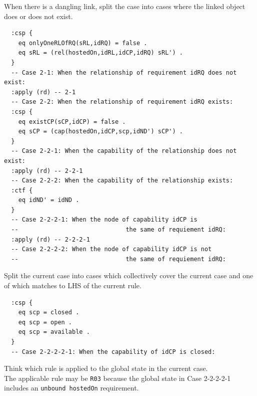 \documentclass[12pt]{report}
\begin{document}
 When there is a dangling link, split the case
into cases where the linked object does or does not exist.
\small
\begin{verbatim}
  :csp {
    eq onlyOneRLOfRQ(sRL,idRQ) = false .
    eq sRL = (rel(hostedOn,idRL,idCP,idRQ) sRL') .
  }
  -- Case 2-1: When the relationship of requirement idRQ does not exist:
  :apply (rd) -- 2-1
  -- Case 2-2: When the relationship of requirement idRQ exists:
  :csp {
    eq existCP(sCP,idCP) = false .
    eq sCP = (cap(hostedOn,idCP,scp,idND') sCP') .
  }
  -- Case 2-2-1: When the capability of the relationship does not exist:
  :apply (rd) -- 2-2-1
  -- Case 2-2-2: When the capability of the relationship exists:
  :ctf {
    eq idND' = idND .
  }
  -- Case 2-2-2-1: When the node of capability idCP is
  --                              the same of requiement idRQ:
  :apply (rd) -- 2-2-2-1
  -- Case 2-2-2-2: When the node of capability idCP is not
  --                              the same of requiement idRQ:
\end{verbatim}
\normalsize
 Split the current case into cases which
collectively cover the current case and one of which matches to LHS of
the current rule. 
\small
\begin{verbatim}
  :csp {
    eq scp = closed .
    eq scp = open .
    eq scp = available .
  }
  -- Case 2-2-2-2-1: When the capability of idCP is closed:
\end{verbatim}
\normalsize
 Think which rule is applied to the 
global state in the current case. \\
The applicable rule may be {\tt R03} because the global state in Case
2-2-2-2-1 includes an {\tt unbound hostedOn} requirement.\\
\end{document}
